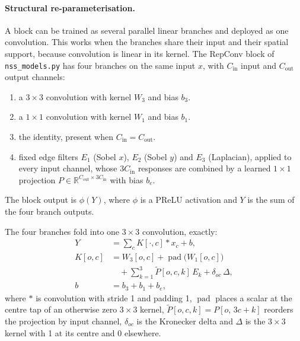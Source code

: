 \paragraph{Structural re-parameterisation.} A block can be trained as several parallel linear branches and deployed as one convolution. This works when the branches share their input and their spatial support, because convolution is linear in its kernel. The RepConv block of \texttt{nss\_models.py} has four branches on the same input $x$, with $C_{\text{in}}$ input and $C_{\text{out}}$ output channels:
\begin{enumerate}
\item a $3\times3$ convolution with kernel $W_3$ and bias $b_3$.
\item a $1\times1$ convolution with kernel $W_1$ and bias $b_1$.
\item the identity, present when $C_{\text{in}}=C_{\text{out}}$.
\item fixed edge filters $E_1$ (Sobel $x$), $E_2$ (Sobel $y$) and $E_3$ (Laplacian), applied to every input channel, whose $3C_{\text{in}}$ responses are combined by a learned $1\times1$ projection $P\in\mathbb R^{C_{\text{out}}\times3C_{\text{in}}}$ with bias $b_e$.
\end{enumerate}
The block output is $\phi(Y)$, where $\phi$ is a PReLU activation and $Y$ is the sum of the four branch outputs.

The four branches fold into one $3\times3$ convolution, exactly:
\begin{equation}\begin{split}
Y&=\sum_{c}K[\cdot,c]\ast x_c+b,\\
K[o,c]&=W_3[o,c]+\operatorname{pad}\big(W_1[o,c]\big)\\
&\quad+\sum_{k=1}^{3}\tilde P[o,c,k]\,E_k+\delta_{oc}\,\Delta,\\
b&=b_3+b_1+b_e,
\end{split}\label{eq:bg-fold}\end{equation}
where $\ast$ is convolution with stride 1 and padding 1, $\operatorname{pad}$ places a scalar at the centre tap of an otherwise zero $3\times3$ kernel, $\tilde P[o,c,k]=P[o,\,3c+k]$ reorders the projection by input channel, $\delta_{oc}$ is the Kronecker delta and $\Delta$ is the $3\times3$ kernel with 1 at its centre and 0 elsewhere.

